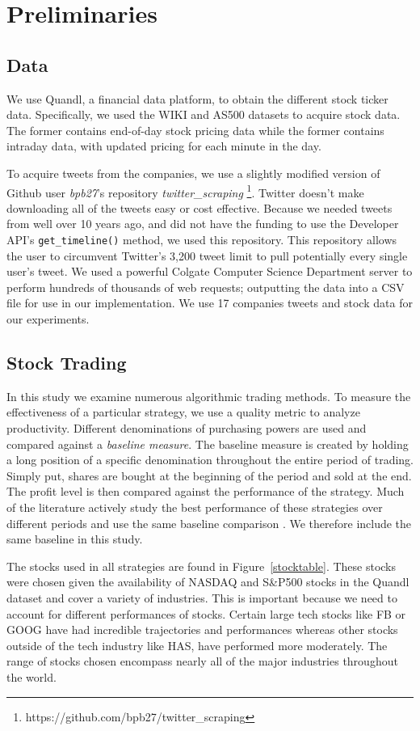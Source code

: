 \documentclass[../thesis.tex]{subfiles}
\begin{document}
\chapter{Preliminaries}
\label{ch:prelim}
\section{Data}
We use Quandl, a financial data platform, to obtain the different stock ticker data. Specifically, we used the WIKI and AS500 datasets to acquire stock data. The former contains end-of-day stock pricing data while the former contains intraday data, with updated pricing for each minute in the day. 

To acquire tweets from the companies, we use a slightly modified version of Github user \textit{bpb27}'s repository \textit{twitter\_scraping} \footnote{https://github.com/bpb27/twitter\_scraping}. Twitter doesn't make downloading all of the tweets easy or cost effective. Because we needed tweets from well over 10 years ago, and did not have the funding to use the Developer API's \texttt{get\_timeline()} method, we used this repository. This repository allows the user to circumvent Twitter's  3,200 tweet limit to pull potentially every single user's tweet. We used a powerful Colgate Computer Science Department server to perform hundreds of thousands of web requests; outputting the data into a CSV file for use in our implementation. We use 17 companies tweets and stock data for our experiments. 

\section{Stock Trading}
In this study we examine numerous algorithmic trading methods. To measure the effectiveness of a particular strategy, we use a quality metric to analyze productivity. Different denominations of purchasing powers are used and compared against a \textit {baseline measure}. The baseline measure is created by holding a long position of a specific denomination throughout the entire period of trading. Simply put, shares are bought at the beginning of the period and sold at the end. The profit level is then compared against the performance of the strategy. Much of the literature actively study the best performance of these strategies over different periods and use the same baseline comparison \cite{Liu2006}. We therefore include the same baseline in this study.

The stocks used in all strategies are found in Figure~\ref{stocktable}. These stocks were chosen given the availability of NASDAQ and S\&P500 stocks in the Quandl dataset and cover a variety of industries. This is important because we need to account for different performances of stocks. Certain large tech stocks like FB or GOOG have had incredible trajectories and performances whereas other stocks outside of the tech industry like HAS, have performed more moderately. The range of stocks chosen encompass nearly all of the major industries throughout the world.
\end{document}
